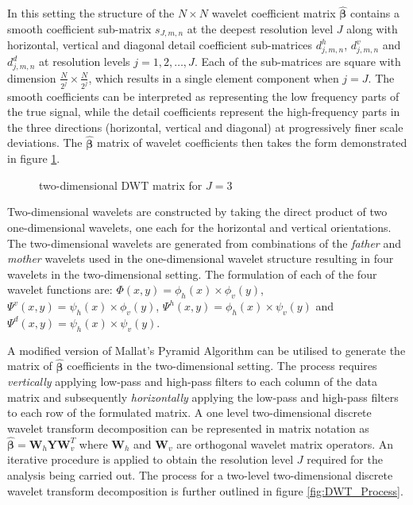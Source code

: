 \documentclass[a4paper, 12pt]{article}
\begin{document}
\medskip

In this setting the structure of the $N \times N$ wavelet coefficient matrix $\bm{\hat{\beta}}$ contains a smooth coefficient sub-matrix $s_{J,m,n}$ at the deepest resolution level $J$ along with horizontal, vertical and diagonal detail coefficient sub-matrices $d^{h}_{j,m,n}$, $d^{v}_{j,m,n}$ and $d^{d}_{j,m,n}$ at resolution levels $j = {1,2,\dots,J}$. Each of the sub-matrices are square with dimension $\frac{N}{2^{j}} \times \frac{N}{2^{j}}$, which results in  a single element component when $j = J$. The smooth coefficients can be interpreted as representing the low frequency parts of the true signal, while the detail coefficients represent the high-frequency parts in the three directions (horizontal, vertical and diagonal) at progressively finer scale deviations. The $\bm{\hat{\beta}}$ matrix of wavelet coefficients then takes the form demonstrated in figure \ref{fig:DWT_Matrix}.

\begin{figure}[ht]
    \centering
	
    \caption{two-dimensional DWT matrix for $J = 3$}
    \label{fig:DWT_Matrix}
\end{figure}

\medskip
Two-dimensional wavelets are constructed by taking the direct product of two one-dimensional wavelets, one each for the horizontal and vertical orientations. The two-dimensional wavelets are generated from combinations of the \textit{father} and \textit{mother} wavelets used in the one-dimensional wavelet structure resulting in four wavelets in the two-dimensional setting. The formulation of each of the four wavelet functions are: $\Phi(x,y)=\phi_{h}(x) \times \phi_{v}(y)$, $\Psi^{v}(x,y)=\psi_{h}(x) \times \phi_{v}(y)$, $\Psi^{h}(x,y)=\phi_{h}(x) \times \psi_{v}(y)$ and $\Psi^{d}(x,y)=\psi_{h}(x) \times \psi_{v}(y)$.

\medskip
A modified version of Mallat's Pyramid Algorithm can be utilised to generate the matrix of $\bm{\hat{\beta}}$ coefficients in the two-dimensional setting. The process requires \textit{vertically} applying low-pass and high-pass filters to each column of the data matrix and subsequently \textit{horizontally} applying the low-pass and high-pass filters to each row of the formulated matrix. A one level two-dimensional discrete wavelet transform decomposition can be represented in matrix notation as
$\bm{\hat{\beta}} = \mathbf{W}_{h} \mathbf{Y} \mathbf{W}^{T}_{v}$
where $\mathbf{W}_{h}$ and $\mathbf{W}_{v}$ are orthogonal wavelet matrix operators. An iterative procedure is applied to obtain the resolution level $J$ required for the analysis being carried out. The process for a two-level two-dimensional discrete wavelet transform decomposition is further outlined in figure \ref{fig:DWT_Process}.
\end{document}
